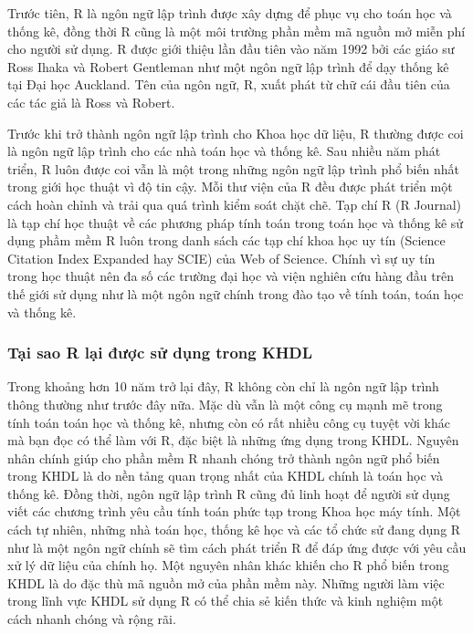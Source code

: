 \documentclass[
]{article}
\begin{document}
Trước tiên, R là ngôn ngữ lập trình được xây dựng để phục vụ cho toán học và thống kê, đồng thời R cũng là một môi trường phần mềm mã nguồn mở miễn phí cho người sử dụng. R được giới thiệu lần đầu tiên vào năm 1992 bởi các giáo sư Ross Ihaka và Robert Gentleman như một ngôn ngữ lập trình để dạy thống kê tại Đại học Auckland. Tên của ngôn ngữ, R, xuất phát từ chữ cái đầu tiên của các tác giả là Ross và Robert.

Trước khi trở thành ngôn ngữ lập trình cho Khoa học dữ liệu, R thường được coi là ngôn ngữ lập trình cho các nhà toán học và thống kê. Sau nhiều năm phát triển, R luôn được coi vẫn là một trong những ngôn ngữ lập trình phổ biến nhất trong giới học thuật vì độ tin cậy. Mỗi thư viện của R đều được phát triển một cách hoàn chỉnh và trải qua quá trình kiểm soát chặt chẽ. Tạp chí R (R Journal) là tạp chí học thuật về các phương pháp tính toán trong toán học và thống kê sử dụng phầm mềm R luôn trong danh sách các tạp chí khoa học uy tín (Science Citation Index Expanded hay SCIE) của Web of Science. Chính vì sự uy tín trong học thuật nên đa số các trường đại học và viện nghiên cứu hàng đầu trên thế giới sử dụng như là một ngôn ngữ chính trong đào tạo về tính toán, toán học và thống kê.

\hypertarget{tux1ea1i-sao-r-lux1ea1i-ux111ux1b0ux1ee3c-sux1eed-dux1ee5ng-trong-khdl}{%
\subsubsection{Tại sao R lại được sử dụng trong KHDL}\label{tux1ea1i-sao-r-lux1ea1i-ux111ux1b0ux1ee3c-sux1eed-dux1ee5ng-trong-khdl}}

Trong khoảng hơn 10 năm trở lại đây, R không còn chỉ là ngôn ngữ lập trình thông thường như trước đây nữa. Mặc dù vẫn là một công cụ mạnh mẽ trong tính toán toán học và thống kê, nhưng còn có rất nhiều công cụ tuyệt vời khác mà bạn đọc có thể làm với R, đặc biệt là những ứng dụng trong KHDL. Nguyên nhân chính giúp cho phần mềm R nhanh chóng trở thành ngôn ngữ phổ biến trong KHDL là do nền tảng quan trọng nhất của KHDL chính là toán học và thống kê. Đồng thời, ngôn ngữ lập trình R cũng đủ linh hoạt để người sử dụng viết các chương trình yêu cầu tính toán phức tạp trong Khoa học máy tính. Một cách tự nhiên, những nhà toán học, thống kê học và các tổ chức sử đang dụng R như là một ngôn ngữ chính sẽ tìm cách phát triển R để đáp ứng được với yêu cầu xử lý dữ liệu của chính họ. Một nguyên nhân khác khiến cho R phổ biến trong KHDL là do đặc thù mã nguồn mở của phần mềm này. Những người làm việc trong lĩnh vực KHDL sử dụng R có thể chia sẻ kiến thức và kinh nghiệm một cách nhanh chóng và rộng rãi.
\end{document}
